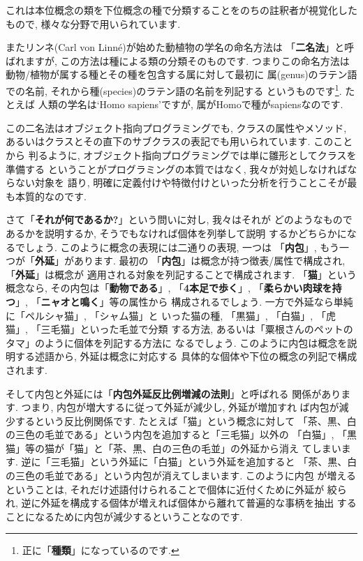  これは本位概念の類を下位概念の種で分類することをのちの註釈者が視覚化した
もので, 様々な分野で用いられています.
\newline

またリンネ(Carl von Linn\'e)が始めた動植物の学名の命名方法は
「\textbf{二名法}」と呼ばれますが, この方法は種による類の分類そのものです.
 つまりこの命名方法は動物/植物が属する種とその種を包含する属に対して最初に
属(genus)のラテン語での名前, それから種(species)のラテン語の名前を列記する
というものです\footnote{正に「\textbf{種類}」になっているのです.}. たとえば
人類の学名は`Homo sapiens'ですが, 属がHomoで種がsapiensなのです.
\newline

この二名法はオブジェクト指向プログラミングでも, クラスの属性やメソッド,
あるいはクラスとその直下のサブクラスの表記でも用いられています. このことから
判るように, オブジェクト指向プログラミングでは単に雛形としてクラスを準備する
ということがプログラミングの本質ではなく, 我々が対処しなければならない対象を
語り, 明確に定義付けや特徴付けといった分析を行うことこそが最も本質的なのです.
\newline


さて「\textbf{それが何であるか?}」という問いに対し, 我々はそれが
どのようなものであるかを説明するか, そうでもなければ個体を列挙して説明
するかどちらかになるでしょう. このように概念の表現には二通りの表現, 一つは
「\textbf{内包}」, もう一つが「\textbf{外延}」があります. 最初の
「\textbf{内包}」は概念が持つ徴表/属性で構成され,「\textbf{外延}」は概念が
適用される対象を列記することで構成されます. 「\textbf{猫}」という概念なら,
 その内包は「\textbf{動物である}」, 「\textbf{4本足で歩く}」,
 「\textbf{柔らかい肉球を持つ}」, 「\textbf{ニャオと鳴く}」等の属性から
構成されるでしょう. 一方で外延なら単純に「ペルシャ猫」, 「シャム猫」と
いった猫の種, 「黒猫」, 「白猫」, 「虎猫」, 「三毛猫」といった毛並で分類
する方法, あるいは「粟根さんのペットのタマ」のように個体を列記する方法に
なるでしょう. このように内包は概念を説明する述語から, 外延は概念に対応する
具体的な個体や下位の概念の列記で構成されます.
\newline


そして内包と外延には「\textbf{内包外延反比例増減の法則}」と呼ばれる
関係があります. つまり, 内包が増大するに従って外延が減少し, 外延が増加すれ
ば内包が減少するという反比例関係です. たとえば「猫」という概念に対して
「茶、黒、白の三色の毛並である」という内包を追加すると「三毛猫」以外の
「白猫」, 「黒猫」等の猫が「猫」と「茶、黒、白の三色の毛並」の外延から消え
てしまいます. 逆に「三毛猫」という外延に「白猫」という外延を追加すると
「茶、黒、白の三色の毛並である」という内包が消えてしまいます. このように内包
が増えるということは, それだけ述語付けられることで個体に近付くために外延が
絞られ, 逆に外延を構成する個体が増えれば個体から離れて普遍的な事柄を抽出
することになるために内包が減少するということなのです. 
\newline

